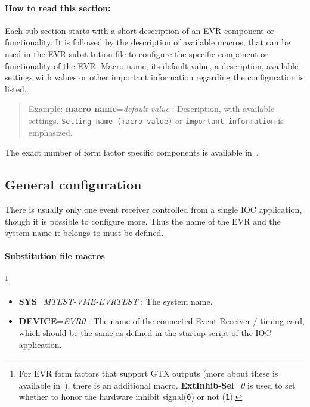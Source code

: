 \documentclass[12pt,a4paper]{article}
\begin{document}
\paragraph{How to read this section:}
Each sub-section starts with a short description of an EVR component or functionality. It is followed by the description of available macros, that can be used in the EVR substitution file to configure the specific component or functionality of the EVR.
Macro name, its default value, a description, available settings with values or other important information regarding the configuration is listed.
\begin{quote}
Example: \textbf{macro name}=\emph{default value} : Description, with available settings. \texttt{Setting name (macro value)} or \texttt{important information} is emphasized.
\end{quote}
The exact number of form factor specific components is available in~\cite{mrm_evr}. 

\subsection{General configuration}
There is usually only one event receiver controlled from a single IOC application, though it is possible to configure more. Thus the name of the EVR and the system name it belongs to must be defined.

\paragraph{Substitution file macros}\footnote{For EVR form factors that support GTX outputs (more about these is available in~\cite{mrm_evr}), there is an additional macro. \textbf{ExtInhib-Sel}=\emph{0} is used to set whether to honor the hardware inhibit signal(\texttt{0}) or not (\texttt{1}).}
\begin{itemize}
\item
	\textbf{SYS}=\emph{MTEST-VME-EVRTEST} : The system name. 
\item
	\textbf{DEVICE}=\emph{EVR0} : The name of the connected Event Receiver / timing card, which should be the same as defined in the startup script of the IOC application. 
\end{itemize}

\end{document}
